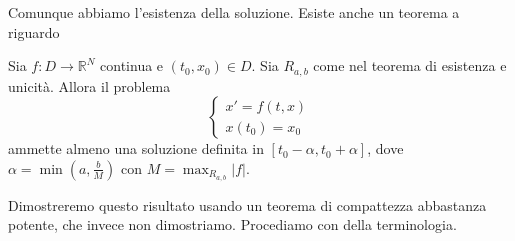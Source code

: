     Comunque abbiamo l'esistenza della soluzione. Esiste anche un teorema a
    riguardo
\begin{theorem}[Peano]
    Sia \(f : D \to \mathbb{R}^{N}\) continua e \((t_{0}, x_{0}) \in D\). Sia
    \(R_{a, b} \) come nel teorema di esistenza e unicità. Allora il problema
    \[
        \begin{cases}
            x' = f(t, x) \\
            x(t_{0}) = x_{0}
        \end{cases}
    \]
    ammette almeno una soluzione definita in \([ t_{0} - \alpha, t_{0} + \alpha
    ]\), dove \(\alpha = \min(a, \frac{b}{M})\) con \(M = \max_{R_{a, b}}|f|\).
\end{theorem}
Dimostreremo questo risultato usando un teorema di compattezza abbastanza
potente, che invece non dimostriamo. Procediamo con della terminologia.

